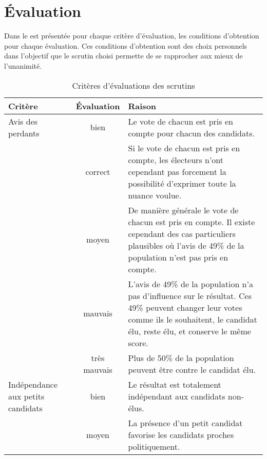 \documentclass[../report]{subfiles}
\begin{document}
  \section{Évaluation}
  
  Dans le  est présentée pour chaque critère d'évaluation, les conditions d'obtention pour chaque évaluation.
  Ces conditions d'obtention sont des choix personnels dans l'objectif que le scrutin choisi permette de se rapprocher aux mieux de l'unanimité.

  \begin{table}
  \caption{Critères d'évaluations des scrutins}%
  \label{tab:criteres:scrutin}%
  \begin{center}
    \begin{tabular}{p{8em}|c|p{28em}}
      \hline
      Critère & Évaluation & Raison \\
      \hline
      \hline
      Avis des perdants & \cellcolor{green}bien & Le vote de chacun est pris en compte pour chacun des candidats. \\
      \cline{2-3}       & \cellcolor{green!25!yellow}correct & Si le vote de chacun est pris en compte, les électeurs n'ont cependant pas forcement la possibilité d'exprimer toute la nuance voulue. \\
      \cline{2-3}       & \cellcolor{orange}moyen & De manière générale le vote de chacun est pris en compte. Il existe cependant des cas particuliers plausibles où l'avis de 49\% de la population n'est pas pris en compte. \\
      \cline{2-3}       & \cellcolor{red}mauvais & L'avis de 49\% de la population n'a pas d’influence sur le résultat. Ces 49\% peuvent changer leur votes comme ils le souhaitent, le candidat élu, reste élu, et conserve le même score. \\
      \cline{2-3}       & \cellcolor{red}très mauvais & Plus de 50\% de la population peuvent être contre le candidat élu. \\
      \hline
      Indépendance aux petits candidats & \cellcolor{green}bien & Le résultat est totalement indépendant aux candidats non-élus. \\
      \cline{2-3}
                       & \cellcolor{orange}moyen & La présence d'un petit candidat favorise les candidats proches politiquement. \\
      \cline{2-3}

\end{tabular}
\end{center}
\end{table}
\end{document}
